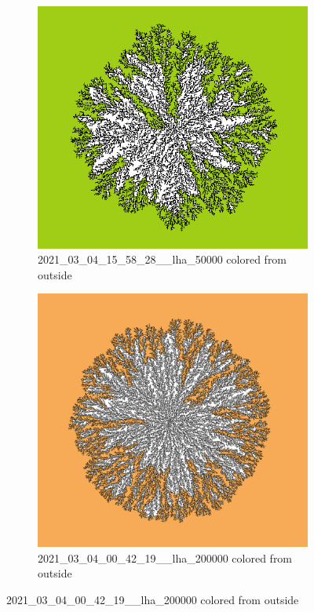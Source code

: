 \documentclass[12pt,a4paper]{scrartcl}
\newcommand{\1}{\mathbbm{1}}
\theoremstyle{definition}
\numberwithin{equation}{section}
\begin{document}
\begin{figure}[p]
	\centering
	\begin{subfigure}[]{0.72\textwidth}
		\includegraphics[width=1\linewidth]{images/ia/2021_03_04_15_58_28__lha_50000_colored.png}
		\caption{2021\_03\_04\_15\_58\_28\_\_lha\_50000 colored from outside} 
	\end{subfigure}
	\begin{subfigure}[]{0.72\textwidth}
		\includegraphics[width=1\linewidth]{images/ia/2021_03_04_00_42_19__lha_200000_colored.png}
		\caption{2021\_03\_04\_00\_42\_19\_\_lha\_200000 colored from outside} 
	\end{subfigure}
\end{figure}
\end{document}

